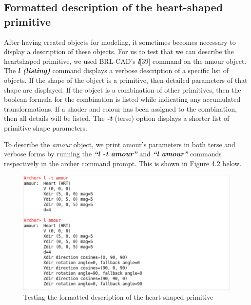 \subsection{Formatted description of the heart­-shaped primitive}

After   having   created   objects   for   modeling,   it   sometimes   becomes  
necessary   to   display   a   description   of   these   objects.   For   us   to   test   that   we   can  
describe   the   heart­shaped   primitive,   we   used   BRL-­CAD's   \textit{\textbf{l}}[39]   command   on  
the   amour   object.   The   \textit{\textbf{l (listing)}}   command   displays   a   verbose   description   of   a
 specific   list   of   objects.   If   the   shape   of   the   object   is   a   primitive,   then   detailed  
parameters   of   that   shape   are   displayed.   If   the   object   is   a   combination   of   other  
primitives,   then   the   boolean   formula   for   the   combination   is   listed   while   indicating  
any   accumulated   transformations.   If   a   shader   and   colour   has   been   assigned   to  
the   combination,   then   all   details   will   be   listed.   The   \textit{\textbf{-­t}}   (terse)   option   displays   a  
shorter list of primitive shape parameters.

\hspace{30} To   describe   the   \textit{amour}   object,   we   print   amour's   parameters   in   both   terse  
and   verbose   forms   by   running   the   \textit{\textbf{“l -t amour”}}   and   \textit{\textbf{“l amour”}}   commands  
respectively in the archer command prompt. This is shown in Figure 4.2 below.

\begin{figure}[htbp]
\centering
\includegraphics[trim=0.0cm 0.5cm 0.1cm 0.1cm, clip=true, totalheight=0.4\textheight]{Pictures/Describe.png}
\caption[Testing the formatted description of the heart­-shaped primitive]{Testing the formatted description of the heart­-shaped primitive}
\label{Describe}
\end{figure}

